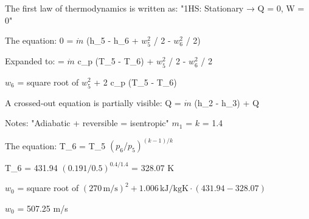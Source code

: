 The first law of thermodynamics is written as:  
"1HS: Stationary → Q = 0, W = 0"  

The equation:  
0 = \( \dot{m} \) (h_5 - h_6 + \( w_5^2 \) / 2 - \( w_6^2 \) / 2)  

Expanded to:  
= \( \dot{m} \) c_p (T_5 - T_6) + \( w_5^2 \) / 2 - \( w_6^2 \) / 2  

\( w_6 \) = square root of \( w_5^2 \) + 2 c_p (T_5 - T_6)  

A crossed-out equation is partially visible:  
Q = \( \dot{m} \) (h_2 - h_3) + Q  

Notes:  
"Adiabatic + reversible = isentropic"  
\( m_1 \) = \( k \) = 1.4  

The equation:  
T_6 = T_5 \( (p_6 / p_5)^{(k-1)/k} \)  

T_6 = 431.94 \( (0.191 / 0.5)^{0.4/1.4} \) = 328.07 K  

\( w_0 \) = square root of \( (270 \, \text{m/s})^2 + 1.006 \, \text{kJ/kgK} \cdot (431.94 - 328.07) \)  

\( w_0 \) = 507.25 m/s
